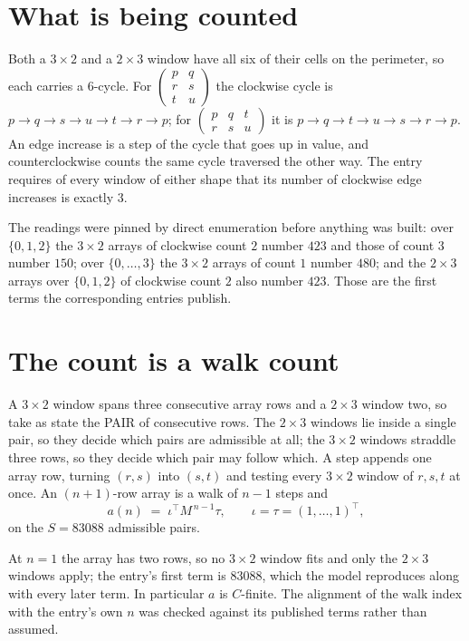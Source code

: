 \documentclass[11pt,a4paper]{article}
\theoremstyle{plain}
\theoremstyle{definition}
\begin{document}
\section{What is being counted}

Both a $3\times2$ and a $2\times3$ window have all six of their cells on the
perimeter, so each carries a $6$-cycle. For
$\begin{pmatrix}p&q\\r&s\\t&u\end{pmatrix}$ the clockwise cycle is
$p\to q\to s\to u\to t\to r\to p$; for
$\begin{pmatrix}p&q&t\\r&s&u\end{pmatrix}$ it is
$p\to q\to t\to u\to s\to r\to p$. An edge increase is a step of the cycle that goes up in
value, and counterclockwise counts the same cycle traversed the other way. The entry requires
of every window of either shape that its number of clockwise edge increases is exactly $3$.

The readings were pinned by direct enumeration before anything was built: over
$\{0,1,2\}$ the $3\times2$ arrays of clockwise count $2$ number $423$ and those of count
$3$ number $150$; over $\{0,\dots,3\}$ the $3\times2$ arrays of count $1$ number $480$;
and the $2\times3$ arrays over $\{0,1,2\}$ of clockwise count $2$ also number $423$. Those
are the first terms the corresponding entries publish.

\section{The count is a walk count}

A $3\times2$ window spans three consecutive array rows and a $2\times3$
window two, so take as state the PAIR of consecutive rows. The $2\times3$ windows lie inside a
single pair, so they decide which pairs are admissible at all; the $3\times2$ windows straddle
three rows, so they decide which pair may follow which. A step appends one array row, turning
$(r,s)$ into $(s,t)$ and testing every $3\times2$ window of $r,s,t$ at once. An $(n+1)$-row
array is a walk of $n-1$ steps and
\[
a(n)\;=\;\iota^{\!\top}M^{\,n-1}\tau,\qquad\iota=\tau=(1,\dots,1)^{\!\top},
\]
on the $S=83088$ admissible pairs.

At $n=1$ the array has two rows, so no $3\times2$ window fits and only the
$2\times3$ windows apply; the entry's first term is
$83088$, which the model reproduces along with every later term.
In particular $a$ is $C$-finite. The alignment of the walk index with the entry's own $n$ was
checked against its published terms rather than assumed.
\end{document}
